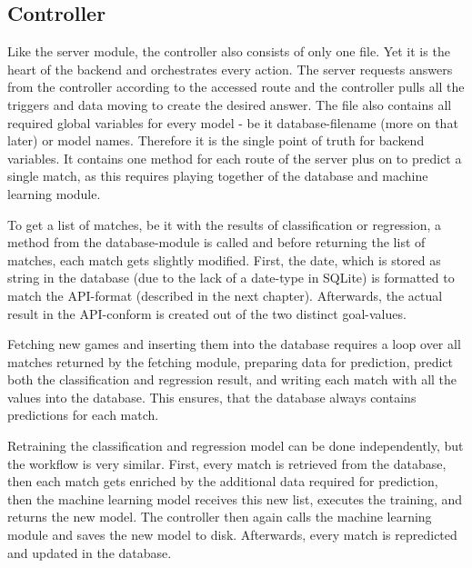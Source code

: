 \subsection{Controller}
Like the server module, the controller also consists of only one file. Yet it is the heart of the backend and orchestrates every action. The server requests answers from the controller according to the accessed route and the controller pulls all the triggers and data moving to create the desired answer. The file also contains all required global variables for every model - be it database-filename (more on that later) or model names. Therefore it is the single point of truth for backend variables. It contains one method for each route of the server plus on to predict a single match, as this requires playing together of the database and machine learning module.

To get a list of matches, be it with the results of classification or regression, a method from the database-module is called and before returning the list of matches, each match gets slightly modified. First, the date, which is stored as string in the database (due to the lack of a date-type in SQLite) is formatted to match the API-format (described in the next chapter). Afterwards, the actual result in the API-conform is created out of the two distinct goal-values.

Fetching new games and inserting them into the database requires a loop over all matches returned by the fetching module, preparing data for prediction, predict both the classification and regression result, and writing each match with all the values into the database. This ensures, that the database always contains predictions for each match.

Retraining the classification and regression model can be done independently, but the workflow is very similar. First, every match is retrieved from the database, then each match gets enriched by the additional data required for prediction, then the machine learning model receives this new list, executes the training, and returns the new model. The controller then again calls the machine learning module and saves the new model to disk. Afterwards, every match is repredicted and updated in the database.

